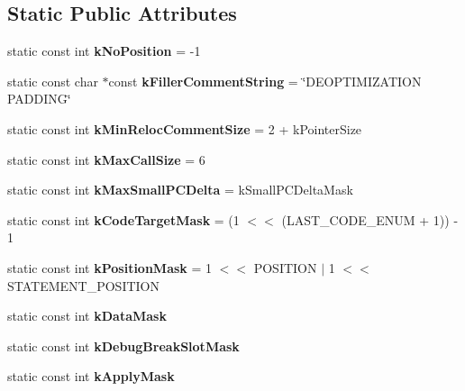 \subsection*{Static Public Attributes}
\begin{DoxyCompactItemize}
\item 
static const int {\bfseries k\+No\+Position} = -\/1\hypertarget{classv8_1_1internal_1_1_reloc_info_af18236bde80b2776cb8e62e565053a89}{}\label{classv8_1_1internal_1_1_reloc_info_af18236bde80b2776cb8e62e565053a89}

\item 
static const char $\ast$const {\bfseries k\+Filler\+Comment\+String} = \char`\"{}D\+E\+O\+P\+T\+I\+M\+I\+Z\+A\+T\+I\+ON P\+A\+D\+D\+I\+NG\char`\"{}\hypertarget{classv8_1_1internal_1_1_reloc_info_a5dca3a70ad12924b3a1d6a42c3b03a98}{}\label{classv8_1_1internal_1_1_reloc_info_a5dca3a70ad12924b3a1d6a42c3b03a98}

\item 
static const int {\bfseries k\+Min\+Reloc\+Comment\+Size} = 2 + k\+Pointer\+Size\hypertarget{classv8_1_1internal_1_1_reloc_info_ac4fb63784119fabde3751f74a4c6317c}{}\label{classv8_1_1internal_1_1_reloc_info_ac4fb63784119fabde3751f74a4c6317c}

\item 
static const int {\bfseries k\+Max\+Call\+Size} = 6\hypertarget{classv8_1_1internal_1_1_reloc_info_a67b0b843b7077292ca5e49d94470c54b}{}\label{classv8_1_1internal_1_1_reloc_info_a67b0b843b7077292ca5e49d94470c54b}

\item 
static const int {\bfseries k\+Max\+Small\+P\+C\+Delta} = k\+Small\+P\+C\+Delta\+Mask\hypertarget{classv8_1_1internal_1_1_reloc_info_aaa24612c6d9accc00a457efc88180136}{}\label{classv8_1_1internal_1_1_reloc_info_aaa24612c6d9accc00a457efc88180136}

\item 
static const int {\bfseries k\+Code\+Target\+Mask} = (1 $<$$<$ (L\+A\+S\+T\+\_\+\+C\+O\+D\+E\+\_\+\+E\+N\+UM + 1)) -\/ 1\hypertarget{classv8_1_1internal_1_1_reloc_info_a0193c4195c5b1dce42953210d9ec6dd4}{}\label{classv8_1_1internal_1_1_reloc_info_a0193c4195c5b1dce42953210d9ec6dd4}

\item 
static const int {\bfseries k\+Position\+Mask} = 1 $<$$<$ P\+O\+S\+I\+T\+I\+ON $\vert$ 1 $<$$<$ S\+T\+A\+T\+E\+M\+E\+N\+T\+\_\+\+P\+O\+S\+I\+T\+I\+ON\hypertarget{classv8_1_1internal_1_1_reloc_info_a0ddf7d06f2fe51a53769262eb9529b6d}{}\label{classv8_1_1internal_1_1_reloc_info_a0ddf7d06f2fe51a53769262eb9529b6d}

\item 
static const int {\bfseries k\+Data\+Mask}
\item 
static const int {\bfseries k\+Debug\+Break\+Slot\+Mask}
\item 
static const int {\bfseries k\+Apply\+Mask}\hypertarget{classv8_1_1internal_1_1_reloc_info_a3674f1738fbd7b36d670397d0fbd363e}{}\label{classv8_1_1internal_1_1_reloc_info_a3674f1738fbd7b36d670397d0fbd363e}

\end{DoxyCompactItemize}
